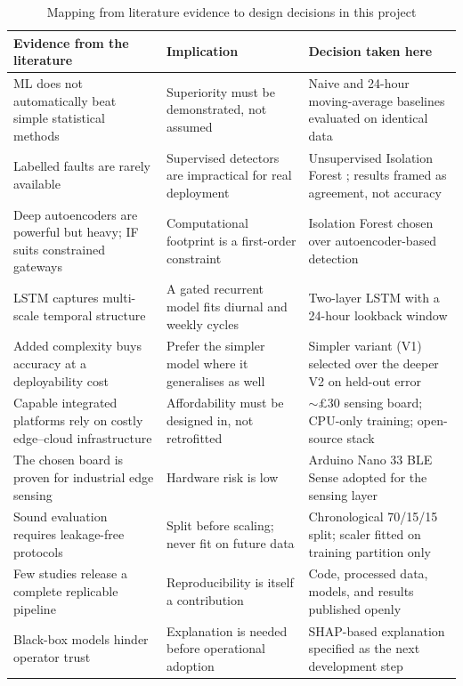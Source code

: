 \documentclass[11pt,a4paper]{article}
\begin{document}
\begin{table}[htbp]
\centering
\caption{Mapping from literature evidence to design decisions in this project}
\label{tab:litmap}
\small
\renewcommand{\arraystretch}{1.35}
\begin{tabular}{|p{4.3cm}|p{5.6cm}|p{4.5cm}|}
\hline
\textbf{Evidence from the literature} & \textbf{Implication} & \textbf{Decision taken here}\\
\hline
ML does not automatically beat simple statistical methods \cite{makridakis2018statistical} &
Superiority must be demonstrated, not assumed &
Naive and 24-hour moving-average baselines evaluated on identical data\\
\hline
Labelled faults are rarely available \cite{himeur2021artificial,jesmeen2021unsupervised} &
Supervised detectors are impractical for real deployment &
Unsupervised Isolation Forest \cite{liu2008isolation}; results framed as agreement, not accuracy\\
\hline
Deep autoencoders are powerful but heavy; IF suits constrained gateways \cite{pereira2018unsupervised,jamshidi2025lightweight} &
Computational footprint is a first-order constraint &
Isolation Forest chosen over autoencoder-based detection\\
\hline
LSTM captures multi-scale temporal structure \cite{hochreiter1997long,kong2017short} &
A gated recurrent model fits diurnal and weekly cycles &
Two-layer LSTM with a 24-hour lookback window\\
\hline
Added complexity buys accuracy at a deployability cost \cite{mahjoub2022predicting,wen2024deep} &
Prefer the simpler model where it generalises as well &
Simpler variant (V1) selected over the deeper V2 on held-out error\\
\hline
Capable integrated platforms rely on costly edge--cloud infrastructure \cite{bin2022real,silva2023iot} &
Affordability must be designed in, not retrofitted &
$\sim$\pounds30 sensing board; CPU-only training; open-source stack\\
\hline
The chosen board is proven for industrial edge sensing \cite{baskar2024edge,warden2019tinyml} &
Hardware risk is low &
Arduino Nano 33 BLE Sense adopted for the sensing layer\\
\hline
Sound evaluation requires leakage-free protocols \cite{makridakis2018statistical} &
Split before scaling; never fit on future data &
Chronological 70/15/15 split; scaler fitted on training partition only\\
\hline
Few studies release a complete replicable pipeline &
Reproducibility is itself a contribution &
Code, processed data, models, and results published openly\\
\hline
Black-box models hinder operator trust \cite{lundberg2017unified} &
Explanation is needed before operational adoption &
SHAP-based explanation specified as the next development step\\
\hline
\end{tabular}
\end{table}
\end{document}
